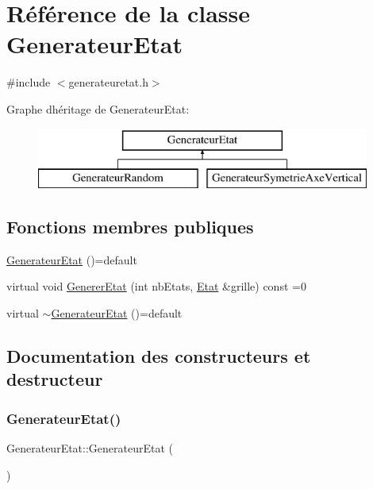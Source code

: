 \hypertarget{class_generateur_etat}{}\section{Référence de la classe Generateur\+Etat}
\label{class_generateur_etat}


{\ttfamily \#include $<$generateuretat.\+h$>$}

Graphe d\textquotesingle{}héritage de Generateur\+Etat\+:\begin{figure}[H]
\begin{center}
\leavevmode
\includegraphics[height=2.000000cm]{class_generateur_etat}
\end{center}
\end{figure}
\subsection*{Fonctions membres publiques}
\begin{DoxyCompactItemize}
\item 
\mbox{\hyperlink{class_generateur_etat_a6ecebc169446d7f5fa40ed37af5abdaf}{Generateur\+Etat}} ()=default
\item 
virtual void \mbox{\hyperlink{class_generateur_etat_a0698d6706e0aaa2e597bdaf280806835}{Generer\+Etat}} (int nb\+Etats, \mbox{\hyperlink{class_etat}{Etat}} \&grille) const =0
\item 
virtual \mbox{\hyperlink{class_generateur_etat_a1ba21b5a12fa8855136363e338209d34}{$\sim$\+Generateur\+Etat}} ()=default
\end{DoxyCompactItemize}


\subsection{Documentation des constructeurs et destructeur}
\mbox{\label{class_generateur_etat_a6ecebc169446d7f5fa40ed37af5abdaf}} 
\subsubsection{\texorpdfstring{Generateur\+Etat()}{GenerateurEtat()}}
{\footnotesize\ttfamily Generateur\+Etat\+::\+Generateur\+Etat (\begin{DoxyParamCaption}{ }\end{DoxyParamCaption})\hspace{0.3cm}{\ttfamily [default]}}

